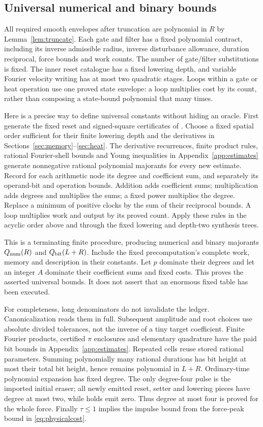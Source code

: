 \documentclass[11pt,a4paper]{amsart}
\theoremstyle{definition}
\theoremstyle{remark}
\numberwithin{equation}{section}
\begin{document}
\subsection{Universal numerical and binary bounds}\label{sec:ledger}
All required smooth envelopes after truncation are polynomial in $R$ by
Lemma~\ref{lem:truncate}. Each gate and filter has a fixed polynomial
contract, including its inverse admissible radius, inverse disturbance
allowance, duration reciprocal, force bounds and work counts. The number
of gate/filter substitutions is fixed. The inner reset catalogue has a
fixed lowering depth, and variable Fourier velocity writing has at most
two quadratic stages. Loops within a gate or heat operation use one
proved state envelope: a loop multiplies cost by its count, rather than
composing a state-bound polynomial that many times.

Here is a precise way to define universal constants without hiding an
oracle. First generate the fixed reset and signed-square certificates of
\cite{Common}. Choose a fixed spatial order sufficient for their finite
lowering depth and the derivatives in Sections~\ref{sec:memory}--\ref{sec:heat}.
The derivative recurrences, finite product rules, rational Fourier-shell
bounds and Young inequalities in Appendix~\ref{app:estimates} generate
nonnegative rational polynomial majorants for every new estimate. Record
for each arithmetic node its degree and coefficient sum, and separately
its operand-bit and operation bounds. Addition adds coefficient sums;
multiplication adds degrees and multiplies the sums; a fixed power
multiplies the degree. Replace a minimum of positive clocks by the sum of
their reciprocal bounds. A loop multiplies work and output by its proved
count. Apply these rules in the acyclic order above and through the fixed
lowering and depth-two synthesis trees.

This is a terminating finite procedure, producing numerical and binary
majorants $Q_{\rm num}(R)$ and $Q_{\rm bit}(L+R)$. Include the fixed
precomputation's complete work, memory and description in their constants.
Let $p$ dominate their degrees and let an integer $A$ dominate their
coefficient sums and fixed costs. This proves the asserted universal bounds.
It does not assert that an enormous fixed table has been executed.

For completeness, long denominators do not invalidate the ledger.
Canonicalization reads them in full. Subsequent amplitude and root choices
use absolute divided tolerances, not the inverse of a tiny target coefficient.
Finite Fourier products, certified $\pi$ enclosures and elementary quadrature
have the paid bit bounds in Appendix~\ref{app:estimates}. Repeated cells
reuse stored rational parameters. Summing polynomially many rational
durations has bit height at most their total bit height, hence remains
polynomial in $L+R$. Ordinary-time polynomial expansion has fixed degree.
The only degree-four pulse is the imported initial eraser; all newly
emitted reset, setter and lowering pieces have degree at most two, while
holds emit zero. Thus degree at most four is proved for the whole force.
Finally $\tau\le1$ implies the impulse bound from the force-peak bound in
\eqref{eq:physicalcost}.
\end{document}
